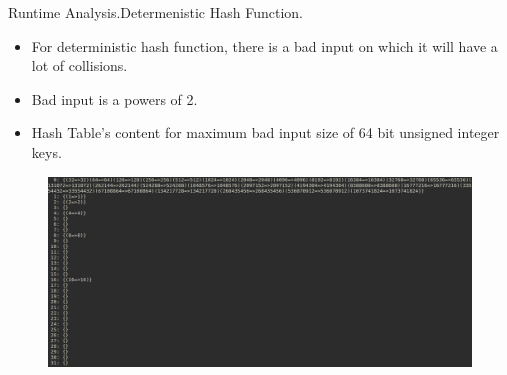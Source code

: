\documentclass{beamer}
\begin{document}

\begin{frame}{Runtime Analysis.}{Determenistic Hash Function.}
  \begin{itemize}
  \item For deterministic hash function, there is a bad input on which it will have a lot of collisions.
  \item Bad input is a powers of 2.
  \item Hash Table's content for maximum bad input size of 64 bit unsigned integer keys. 
  \end{itemize}
  \begin{figure}
    \includegraphics[scale=0.3]{pictures/worst_uint64_t_input}
  \end{figure}
\end{frame}
\end{document}

